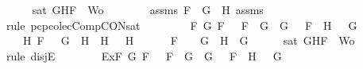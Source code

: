 \begin{isabellebody}
\ \ \ \ \isamarkupfalse%
\ {\isachardoublequoteopen}sat\ {\isacharparenleft}{\isacharbraceleft}G{\isacharcomma}H{\isacharcomma}F{\isacharbraceright}\ {\isasymunion}\ Wo{\isacharparenright}{\isachardoublequoteclose}\isanewline
\ \ \ \ \ \ \isamarkupfalse%
\ assms{\isacharparenleft}{}{\isacharparenright}\ {\isacartoucheopen}F\ {\isacharequal}\ G\ \isactrlbold {\isasymand}\ H{\isacartoucheclose}\ assms{\isacharparenleft}{}{\isacharcomma}{}{\isacharcomma}{}{\isacharparenright}\ \isamarkupfalse%
\ {\isacharparenleft}rule\ pcp{\isacharunderscore}colecComp{\isacharunderscore}CON{\isacharunderscore}sat{}{\isacharparenright}\isanewline
\ \ \isamarkupfalse%
\isanewline
\ \ \ \ \isamarkupfalse%
\ {\isachardoublequoteopen}{\isacharparenleft}{\isasymexists}F{}\ G{}{\isachardot}\ F\ {\isacharequal}\ \isactrlbold {\isasymnot}\ {\isacharparenleft}F{}\ \isactrlbold {\isasymor}\ G{}{\isacharparenright}\ {\isasymand}\ G\ {\isacharequal}\ \isactrlbold {\isasymnot}\ F{}\ {\isasymand}\ H\ {\isacharequal}\ \isactrlbold {\isasymnot}\ G{}{\isacharparenright}\ {\isasymor}\ \isanewline
\ \ \ \ {\isacharparenleft}{\isasymexists}H{}{\isachardot}\ F\ {\isacharequal}\ \isactrlbold {\isasymnot}\ {\isacharparenleft}G\ \isactrlbold {\isasymrightarrow}\ H{}{\isacharparenright}\ {\isasymand}\ H\ {\isacharequal}\ \isactrlbold {\isasymnot}\ H{}{\isacharparenright}\ {\isasymor}\ \isanewline
\ \ \ \ F\ {\isacharequal}\ \isactrlbold {\isasymnot}\ {\isacharparenleft}\isactrlbold {\isasymnot}\ G{\isacharparenright}\ {\isasymand}\ H\ {\isacharequal}\ G{\isachardoublequoteclose}\isanewline
\ \ \ \ \isamarkupfalse%
\ {\isachardoublequoteopen}sat\ {\isacharparenleft}{\isacharbraceleft}G{\isacharcomma}H{\isacharcomma}F{\isacharbraceright}\ {\isasymunion}\ Wo{\isacharparenright}{\isachardoublequoteclose}\isanewline
\ \ \ \ \isamarkupfalse%
\ {\isacharparenleft}rule\ disjE{\isacharparenright}\isanewline
\ \ \ \ \ \ \isamarkupfalse%
\ Ex{}{\isacharcolon}{\isachardoublequoteopen}{\isasymexists}F{}\ G{}{\isachardot}\ F\ {\isacharequal}\ \isactrlbold {\isasymnot}\ {\isacharparenleft}F{}\ \isactrlbold {\isasymor}\ G{}{\isacharparenright}\ {\isasymand}\ G\ {\isacharequal}\ \isactrlbold {\isasymnot}\ F{}\ {\isasymand}\ H\ {\isacharequal}\ \isactrlbold {\isasymnot}\ G{}{\isachardoublequoteclose}\ \isanewline

\end{isabellebody}
